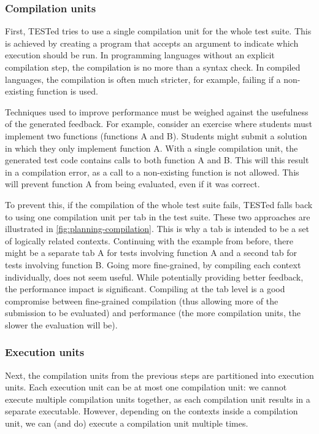 \documentclass[../main]{subfiles}
\begin{document}
\subsubsection{Compilation units}
\label{subsubsec:compilation-units}

First, TESTed tries to use a single compilation unit for the whole test suite.
This is achieved by creating a program that accepts an argument to indicate which execution should be run.
In programming languages without an explicit compilation step, the compilation is no more than a syntax check.
In compiled languages, the compilation is often much stricter, for example, failing if a non-existing function is used.

Techniques used to improve performance must be weighed against the usefulness of the generated feedback.
For example, consider an exercise where students must implement two functions (functions A and B).
Students might submit a solution in which they only implement function A\@.
With a single compilation unit, the generated test code contains calls to both function A and B\@.
This will this result in a compilation error, as a call to a non-existing function is not allowed.
This will prevent function A from being evaluated, even if it was correct.

To prevent this, if the compilation of the whole test suite fails, TESTed falls back to using one compilation unit per tab in the test suite.
These two approaches are illustrated in \cref{fig:planning-compilation}.
This is why a tab is intended to be a set of logically related contexts.
Continuing with the example from before, there might be a separate tab A for tests involving function A and a second tab for tests involving function B\@.
Going more fine-grained, by compiling each context individually, does not seem useful.
While potentially providing better feedback, the performance impact is significant.
Compiling at the tab level is a good compromise between fine-grained compilation (thus allowing more of the submission to be evaluated) and performance (the more compilation units, the slower the evaluation will be).

\subsubsection{Execution units}

Next, the compilation units from the previous steps are partitioned into execution units.
Each execution unit can be at most one compilation unit: we cannot execute multiple compilation units together,
as each compilation unit results in a separate executable.
However, depending on the contexts inside a compilation unit, we can (and do) execute a compilation unit multiple times.
\end{document}
